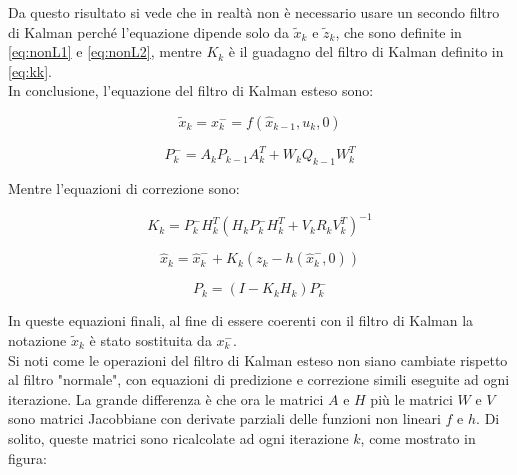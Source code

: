 Da questo risultato si vede che in realtà non è necessario usare un secondo filtro di Kalman perché l'equazione dipende solo da $\tilde{x}_k$ e $\tilde{z}_k$, che sono definite in \ref{eq:nonL1} e \ref{eq:nonL2}, mentre $K_k$ è il guadagno del filtro di Kalman definito in \ref{eq:kk}.\\
In conclusione, l'equazione del filtro di Kalman esteso sono:

\begin{equation}
\tilde{x}_k = x_k^- = f(\hat{x}_{k-1},u_k,0)
\end{equation}

\begin{equation}
P_k^- = A_k P_{k-1}A_k^T + W_k Q_{k-1} W_k^T
\end{equation}

Mentre l'equazioni di correzione sono:

\begin{equation}
K_k = P_k^- H_k^T (H_kP_k^-H_k^T + V_kR_kV_k^T)^{-1}
\end{equation}

\begin{equation}
\hat{x}_k = \hat{x}_k^- + K_k (z_k - h(\hat{x}_k^-,0))
\end{equation}


\begin{equation}
P_k= (I - K_k H_k)P_k^-
\end{equation}

In queste equazioni finali, al fine di essere coerenti con il filtro di Kalman la notazione $\tilde{x}_k$ è stato sostituita da $x_k^-$.\\
Si noti come le operazioni del filtro di Kalman esteso non siano cambiate rispetto al filtro "normale", con equazioni di predizione e correzione simili eseguite ad ogni iterazione. La grande differenza è che ora le matrici $A$ e $H$ più le matrici $W$ e $V$ sono matrici Jacobbiane con derivate parziali delle funzioni non lineari $f$ e $h$. Di solito, queste matrici sono ricalcolate ad ogni iterazione $k$, come mostrato in figura:


